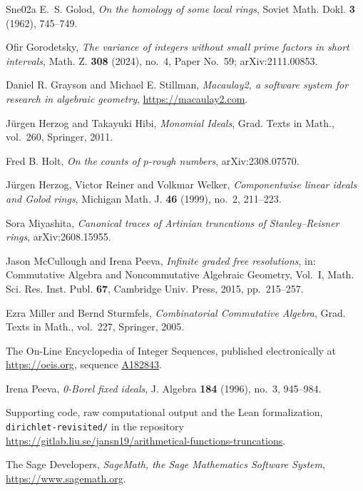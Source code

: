 \documentclass[a4paper,11pt,oneside,reqno]{amsart}
\theoremstyle{definition}
\theoremstyle{remark}
\theoremstyle{plain}
\newcommand{\seqnum}[1]{\href{https://oeis.org/#1}{\underline{#1}}}
\begin{document}
\begin{thebibliography}{Sne02a}
E.~S. Golod,
\emph{On the homology of some local rings},
Soviet Math. Dokl. \textbf{3} (1962), 745--749.

Ofir Gorodetsky,
\emph{The variance of integers without small prime factors in short intervals},
Math. Z. \textbf{308} (2024), no.~4, Paper No.~59; arXiv:2111.00853.

Daniel R. Grayson and Michael E. Stillman,
\emph{Macaulay2, a software system for research in algebraic geometry},
\url{https://macaulay2.com}.

Jürgen Herzog and Takayuki Hibi,
\emph{Monomial Ideals},
Grad. Texts in Math., vol.~260, Springer, 2011.

Fred B. Holt,
\emph{On the counts of \(p\)-rough numbers},
arXiv:2308.07570.

Jürgen Herzog, Victor Reiner and Volkmar Welker,
\emph{Componentwise linear ideals and Golod rings},
Michigan Math. J. \textbf{46} (1999), no.~2, 211--223.

Sora Miyashita,
\emph{Canonical traces of Artinian truncations of Stanley--Reisner rings},
arXiv:2608.15955.

Jason McCullough and Irena Peeva,
\emph{Infinite graded free resolutions},
in: Commutative Algebra and Noncommutative Algebraic Geometry, Vol.~I,
Math. Sci. Res. Inst. Publ. \textbf{67}, Cambridge Univ. Press, 2015,
pp.~215--257.

Ezra Miller and Bernd Sturmfels,
\emph{Combinatorial Commutative Algebra},
Grad. Texts in Math., vol.~227, Springer, 2005.

The On-Line Encyclopedia of Integer Sequences, published electronically at
\url{https://oeis.org}, sequence \seqnum{A182843}.

Irena Peeva,
\emph{0-Borel fixed ideals},
J. Algebra \textbf{184} (1996), no.~3, 945--984.

Supporting code, raw computational output and the Lean formalization,
\texttt{dirichlet-revisited/} in the repository
\url{https://gitlab.liu.se/jansn19/arithmetical-functions-truncations}.

The Sage Developers,
\emph{SageMath, the Sage Mathematics Software System},
\url{https://www.sagemath.org}.


\end{thebibliography}
\end{document}
